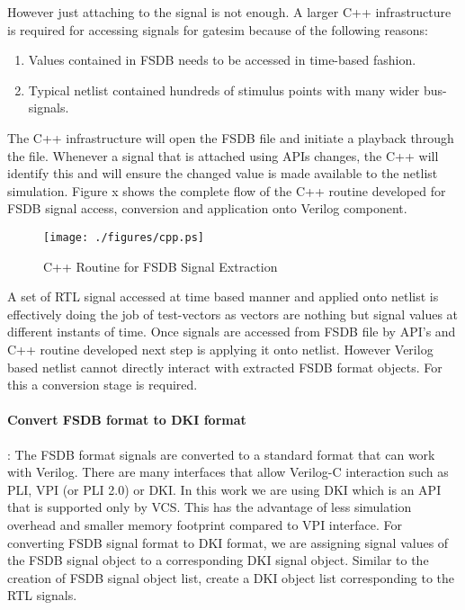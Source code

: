 However just attaching to the signal is not enough. A larger C++ infrastructure is required for accessing signals for gatesim because of the following reasons:
\begin{enumerate}
\item Values contained in FSDB needs to be accessed in time-based fashion.
\item Typical netlist contained hundreds of stimulus points with many wider bus-signals.
\end{enumerate}
The C++ infrastructure will open the FSDB file and initiate a playback through the file. Whenever a signal that is attached using APIs changes, the C++ will identify this and will ensure the changed value is made available to the netlist simulation.  Figure x shows the complete flow of the C++ routine developed for FSDB signal access, conversion and application onto Verilog component.


\begin{figure}[h]
\centering
\texttt{[image: ./figures/cpp.ps]}
\caption{C++ Routine for FSDB Signal Extraction}
\label{fig:cpp.eps}
\end{figure}




A set of RTL signal accessed at time based manner and applied onto netlist is effectively doing the job of test-vectors as vectors are nothing but signal values at different instants of time.
Once signals are accessed from FSDB file by API's and C++ routine developed next step is applying it onto netlist. However Verilog based netlist cannot directly interact with extracted FSDB format objects. For this a conversion stage is required.  




\paragraph{Convert FSDB format to DKI format}: The FSDB format signals are converted to a standard format that can work with Verilog. There are many interfaces that allow Verilog-C interaction such as PLI, VPI (or PLI 2.0) or DKI. 
In this work we are using DKI which is an API that is supported only by VCS. This has the advantage of less simulation overhead and smaller memory footprint compared to VPI interface.
For converting FSDB signal format to DKI format, we are assigning signal values of the FSDB signal object to a corresponding DKI signal object. Similar to the creation of FSDB signal object list, create a DKI object list corresponding to the RTL signals. 

